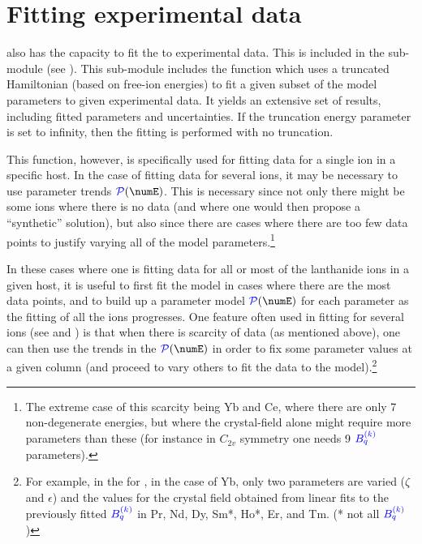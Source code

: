 \documentclass[11pt, twoside,openright]{article}
\begin{document}
\section{Fitting experimental data}\label{section:data-fitting}

\qlanth also has the capacity to fit the \hamilton to experimental data. This is included in the sub-module  (see ). This sub-module includes the function  which uses a truncated Hamiltonian (based on free-ion energies) to fit a given subset of the model parameters to given experimental data. It yields an extensive set of results, including fitted parameters and uncertainties. If the truncation energy parameter is set to infinity, then the fitting is performed with no truncation.  

\label{note:param-model}

This function, however, is specifically used for fitting data for a single ion in a specific host. In the case of fitting data for several ions, it may be necessary to use parameter trends $\Param(\numE)$. This is necessary since not only there might be some ions where there is no data (and where one would then propose a ``synthetic'' solution), but also since there are cases where there are too few data points to justify varying all of the model parameters.\footnote{The extreme case of this scarcity being Yb and Ce, where there are only 7 non-degenerate energies, but where the crystal-field alone might require more parameters than these (for instance in $C_{2v}$ symmetry one needs 9 $\textcolor{blue}{B^{(k)}_{q}}$ parameters).}

In these cases where one is fitting data for all or most of the lanthanide ions in a given host, it is  useful to first fit the model in cases where there are the most data points, and to  build up a parameter model $\Param(\numE)$ for each parameter as the fitting of all the ions progresses. One feature often used in fitting for several ions (see \bill and \cheng) is that when there is scarcity of data (as mentioned above), one can then use the trends in the $\Param(\numE)$ in order to fix some parameter values at a given column (and proceed to vary others to fit the data to the model).\footnote{For example, in the  for \LaFthree, in the case of Yb, only two parameters are varied ($\zeta$ and $\epsilon$) and the values for the crystal field obtained from linear fits to the previously fitted $\textcolor{blue}{B^{(k)}_{q}}$ in Pr, Nd, Dy,  Sm*, Ho*, Er, and Tm. (* not all $\textcolor{blue}{B^{(k)}_{q}}$)}
\end{document}
